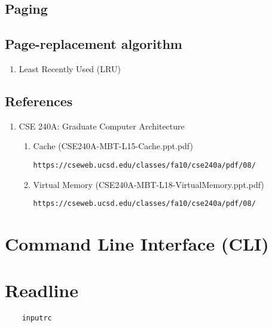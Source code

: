 \documentclass{article}
\begin{document}
\subsection{Paging}

\subsection{Page-replacement algorithm}

\begin{enumerate}

\item Least Recently Used (LRU)

\end{enumerate}

\subsection{References}

\begin{enumerate}

\item CSE 240A: Graduate Computer Architecture

	\begin{enumerate}

	\item Cache (CSE240A-MBT-L15-Cache.ppt.pdf)

	\texttt{https://cseweb.ucsd.edu/classes/fa10/cse240a/pdf/08/}

	\item Virtual Memory (CSE240A-MBT-L18-VirtualMemory.ppt.pdf)

	\texttt{https://cseweb.ucsd.edu/classes/fa10/cse240a/pdf/08/}

	\end{enumerate}

\end{enumerate}

\section{Command Line Interface (CLI)}

\section{Readline}

\begin{verbatim}
	inputrc
\end{verbatim}
\end{document}
